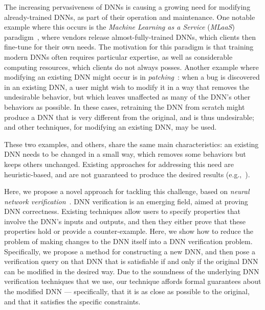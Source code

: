 \documentclass{easychair}
\begin{document}
The increasing pervasiveness of DNNs is causing a growing need for
modifying already-trained DNNs, as part of their operation and
maintenance. One notable example where this occurs is the
\emph{Machine Learning as a Service} (\emph{MLaaS})
paradigm~\cite{RiGrCa15}, where vendors release almost-fully-trained
DNNs, which clients then fine-tune for their own needs. The motivation
for this paradigm is that training modern DNNs often requires
particular expertise, as well as considerable computing resources,
which clients do not always posses. Another example where modifying an
existing DNN might occur is in \emph{patching}~\cite{SoTh19}: when a
bug is discovered in an existing DNN, a user might wish to modify it
in a way that removes the undesirable behavior, but which leaves
unaffected as many of the DNN's other behaviors as possible. In these
cases, retraining the DNN from scratch might produce a DNN that is
very different from the original, and is thus undesirable; and other
techniques, for modifying an existing DNN, may be used.

These two examples, and others, share the same main characteristics: an
existing DNN needs to be changed in a small way, which removes some
behaviors but keeps others unchanged. Existing approaches for
addressing this need are heuristic-based, and are not guaranteed to
produce the desired results (e.g.,~\cite{KaLe18,KaFu18,SoTh19}).

Here, we propose a novel approach for tackling this challenge, based
on \emph{neural network
  verification}~\cite{HuKwWaWu17,KaBaDiJuKo17Reluplex}. DNN
verification is an emerging field, aimed at proving DNN correctness.
Existing techniques allow users to specify properties that involve the
DNN's inputs and outputs, and then they either prove that these properties hold
or provide a counter-example. Here, we show how to reduce the problem
of making changes to the DNN itself into a DNN verification
problem. Specifically, we propose a method for constructing a new DNN,
and then pose a verification query on that DNN that is satisfiable if
and only if the original DNN can be modified in the desired way. Due
to the soundness of the underlying DNN verification techniques that we
use, our technique affords formal guarantees about the modified DNN
--- specifically, that it is as close as possible to the original, and
that it satisfies the specific constraints.


\end{document}

